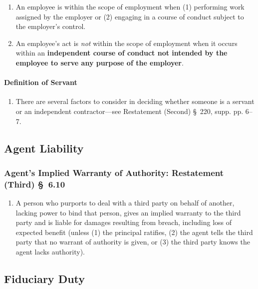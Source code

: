 \begin{enumerate}
    \item An employee is within the scope of employment when (1) performing 
    work assigned by the employer or (2) engaging in a course of conduct 
    subject to the employer's control.
    \item An employee's act is \emph{not} within the scope of employment when 
    it occurs within an \textbf{independent course of conduct not intended by 
    the employee to serve any purpose of the employer}. %
\end{enumerate}

\paragraph{Definition of Servant}

\begin{enumerate}
    \item There are several factors to consider in deciding whether someone is 
    a servant or an independent contractor---see Restatement (Second) \S\ 220, 
    supp. pp. 6--7.
\end{enumerate}

\subsection{Agent Liability}

\subsubsection{Agent's Implied Warranty of Authority: Restatement (Third) \S\ 
6.10}

\begin{enumerate}
    \item A person who purports to deal with a third party on behalf of 
    another, lacking power to bind that person, gives an implied warranty to 
    the third party and is liable for damages resulting from breach, including 
    loss of expected benefit (unless (1) the principal ratifies, (2) the agent 
    tells the third party that no warrant of authority is given, or (3) the 
    third party knows the agent lacks authority).
\end{enumerate}

\subsection{Fiduciary Duty}

